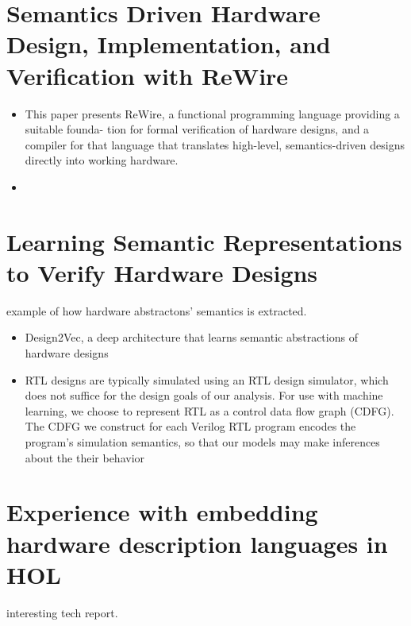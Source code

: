 \documentclass[]{article}
\begin{document}
\section{Semantics Driven Hardware Design, Implementation, and Verification with ReWire}

\begin{itemize}
    \item This paper presents ReWire,
    a functional programming language providing a suitable founda-
    tion for formal verification of hardware designs, and a compiler for
    that language that translates high-level, semantics-driven designs
    directly into working hardware. 
    \item 
\end{itemize}

\section{Learning Semantic Representations to Verify Hardware Designs}

example of how hardware abstractons' semantics is extracted.

\begin{itemize}
    \item Design2Vec, a deep architecture that learns
    semantic abstractions of hardware designs
    \item RTL designs are typically simulated using an RTL design simulator, which does not suffice for
    the design goals of our analysis. For use with machine learning, we choose to represent RTL as a
    control data flow graph (CDFG). The CDFG we construct for each Verilog RTL program encodes the
    program’s simulation semantics, so that our models may make inferences about the their behavior

\end{itemize}

\section{Experience with embedding hardware description languages in HOL}

interesting tech report. 
\end{document}
